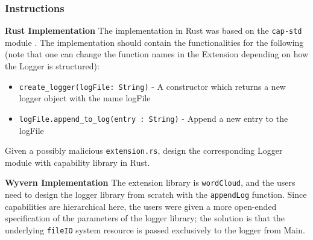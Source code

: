 \subsubsection{Instructions}
\noindent
\textbf{Rust Implementation}
The implementation in Rust was based on the \texttt{cap-std} module \cite{rustCap}. The implementation should contain the functionalities for the following (note that one can change the function names in the Extension depending on how the Logger is structured): 

\begin{itemize}
    \item \texttt{create_logger(logFile: String)} - A constructor which returns a new logger object with the name logFile
    \item \texttt{logFile.append_to_log(entry : String)} - Append a new entry to the logFile
\end{itemize}


Given a possibly malicious \texttt{extension.rs}, design the corresponding Logger module with capability library in Rust.

\noindent
\textbf{Wyvern Implementation} The extension library is \texttt{wordCloud}, and the users need to design the logger library from scratch with the \texttt{appendLog} function. Since capabilities are hierarchical here, the users were given a more open-ended specification of the parameters of the logger library; the solution is that the underlying \texttt{fileIO} system resource is passed exclusively to the logger from Main.


